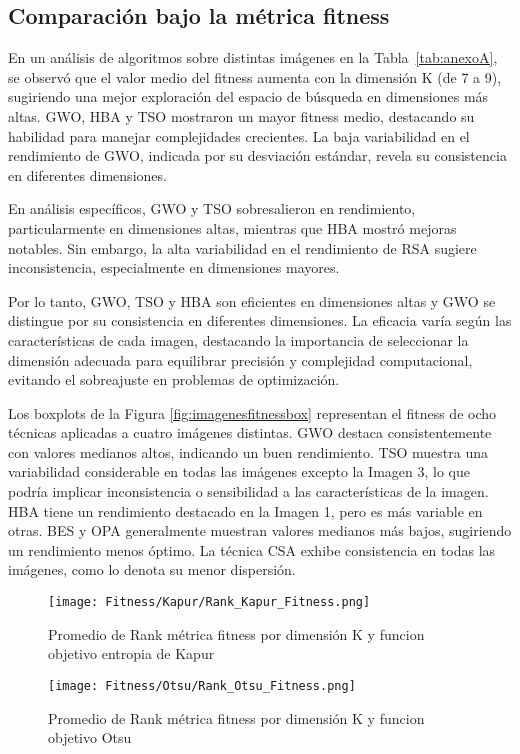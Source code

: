 \documentclass[conference]{IEEEtran}
\begin{document}
\subsection{Comparación bajo la métrica fitness}
\noindent En un análisis de algoritmos sobre distintas imágenes en la Tabla~\ref{tab:anexoA}, se observó que el valor medio del fitness aumenta con la dimensión K (de 7 a 9), sugiriendo una mejor exploración del espacio de búsqueda en dimensiones más altas. GWO, HBA y TSO mostraron un mayor fitness medio, destacando su habilidad para manejar complejidades crecientes. La baja variabilidad en el rendimiento de GWO, indicada por su desviación estándar, revela su consistencia en diferentes dimensiones.

\noindent En análisis específicos, GWO y TSO sobresalieron en rendimiento, particularmente en dimensiones altas, mientras que HBA mostró mejoras notables. Sin embargo, la alta variabilidad en el rendimiento de RSA sugiere inconsistencia, especialmente en dimensiones mayores.

\noindent Por lo tanto, GWO, TSO y HBA son eficientes en dimensiones altas y GWO se distingue por su consistencia en diferentes dimensiones. La eficacia varía según las características de cada imagen, destacando la importancia de seleccionar la dimensión adecuada para equilibrar precisión y complejidad computacional, evitando el sobreajuste en problemas de optimización.


\noindent Los boxplots  de la Figura \ref{fig:imagenesfitnessbox} representan el fitness de ocho técnicas aplicadas a cuatro imágenes distintas. GWO destaca consistentemente con valores medianos altos, indicando un buen rendimiento. TSO muestra una variabilidad considerable en todas las imágenes excepto la Imagen 3, lo que podría implicar inconsistencia o sensibilidad a las características de la imagen. HBA tiene un rendimiento destacado en la Imagen 1, pero es más variable en otras. BES y OPA generalmente muestran valores medianos más bajos, sugiriendo un rendimiento menos óptimo. La técnica CSA exhibe consistencia en todas las imágenes, como lo denota su menor dispersión.



\begin{figure}[!htb]
    \centering
    \texttt{[image: Fitness/Kapur/Rank\_Kapur\_Fitness.png]}
    \caption{Promedio de Rank métrica fitness por dimensión K y funcion objetivo entropia de Kapur}
    \label{fig:fig510}
\end{figure}
\begin{figure}[!htb]
	\centering
	\texttt{[image: Fitness/Otsu/Rank\_Otsu\_Fitness.png]}
	\caption{Promedio de Rank métrica fitness por dimensión K y funcion objetivo Otsu}
	\label{fig:fig510}
\end{figure}
\end{document}
